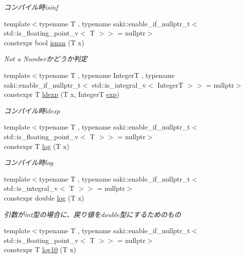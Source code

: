 \begin{DoxyCompactItemize}
\begin{DoxyCompactList}\small\item\em コンパイル時isinf \end{DoxyCompactList}\item 
{\footnotesize template$<$typename T , typename saki\+::enable\+\_\+if\+\_\+nullptr\+\_\+t$<$ std\+::is\+\_\+floating\+\_\+point\+\_\+v$<$ T $>$$>$  = nullptr$>$ }\\constexpr bool \mbox{\hyperlink{namespacesaki_a446ca3f39e4dc8e57db4aafa03a4e232}{isnan}} (T x)
\begin{DoxyCompactList}\small\item\em Not a Numberかどうか判定 \end{DoxyCompactList}\item 
{\footnotesize template$<$typename T , typename IntegerT , typename saki\+::enable\+\_\+if\+\_\+nullptr\+\_\+t$<$ std\+::is\+\_\+integral\+\_\+v$<$ Integer\+T $>$$>$  = nullptr$>$ }\\constexpr T \mbox{\hyperlink{namespacesaki_a03b7a22945dcbce6e2bb0593025c90c4}{ldexp}} (T x, IntegerT \mbox{\hyperlink{namespacesaki_abc1268e543a60d43b04f1418f5ef3e41}{exp}})
\begin{DoxyCompactList}\small\item\em コンパイル時ldexp \end{DoxyCompactList}\item 
{\footnotesize template$<$typename T , typename saki\+::enable\+\_\+if\+\_\+nullptr\+\_\+t$<$ std\+::is\+\_\+floating\+\_\+point\+\_\+v$<$ T $>$$>$  = nullptr$>$ }\\constexpr T \mbox{\hyperlink{namespacesaki_a64136b916afd50ceb9bfb93ae12c63fb}{log}} (T x)
\begin{DoxyCompactList}\small\item\em コンパイル時log \end{DoxyCompactList}\item 
{\footnotesize template$<$typename T , typename saki\+::enable\+\_\+if\+\_\+nullptr\+\_\+t$<$ std\+::is\+\_\+integral\+\_\+v$<$ T $>$$>$  = nullptr$>$ }\\constexpr double \mbox{\hyperlink{namespacesaki_a7f260fd4311e2bd21ae770f8aed6fa81}{log}} (T x)
\begin{DoxyCompactList}\small\item\em 引数がint型の場合に、戻り値をdouble型にするためのもの \end{DoxyCompactList}\item 
{\footnotesize template$<$typename T , typename saki\+::enable\+\_\+if\+\_\+nullptr\+\_\+t$<$ std\+::is\+\_\+floating\+\_\+point\+\_\+v$<$ T $>$$>$  = nullptr$>$ }\\constexpr T \mbox{\hyperlink{namespacesaki_aa1a5f3dfe15009e9e985b8b0647211e6}{log10}} (T x)

\end{DoxyCompactItemize}
